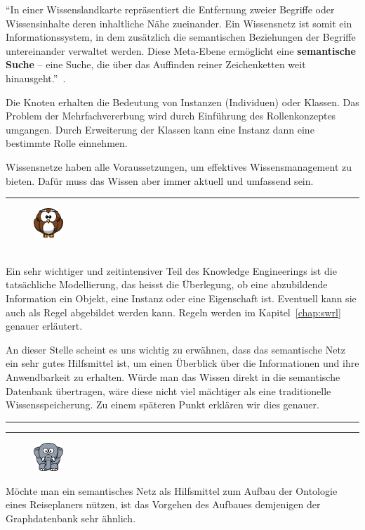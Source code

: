 ``In einer Wissenslandkarte repräsentiert die Entfernung zweier Begriffe oder Wissensinhalte deren inhaltliche Nähe zueinander. Ein Wissensnetz ist somit ein Informationssystem, in dem zusätzlich die semantischen Beziehungen der Begriffe untereinander verwaltet werden. Diese Meta-Ebene ermöglicht eine \textbf{semantische Suche} – eine Suche, die über das Auffinden reiner Zeichenketten weit hinausgeht.''~\cite[S. 89]{laemmel}.

Die Knoten erhalten die Bedeutung von Instanzen (Individuen) oder Klassen. Das Problem der Mehrfachvererbung wird durch Einführung des Rollenkonzeptes umgangen. Durch Erweiterung der Klassen kann eine Instanz dann eine bestimmte Rolle einnehmen.

Wissensnetze haben alle Voraussetzungen, um effektives Wissensmanagement zu bieten. Dafür muss das Wissen aber immer aktuell und umfassend sein.

\newpage

\noindent\rule[1ex]{\textwidth}{1pt}
\begin{figure}
    \vspace{-2pt}
    \includegraphics[width=0.1\textwidth]{bilder/owl.png}
\end{figure}\\
Ein sehr wichtiger und zeitintensiver Teil des Knowledge Engineerings ist die tatsächliche Modellierung, das heisst die Überlegung, ob eine abzubildende Information ein Objekt, eine Instanz oder eine Eigenschaft ist. Eventuell kann sie auch als Regel abgebildet werden kann. Regeln werden im Kapitel~\ref{chap:swrl}  genauer erläutert.

An dieser Stelle scheint es uns wichtig zu erwähnen, dass das semantische Netz ein sehr gutes Hilfsmittel ist, um einen Überblick über die Informationen und ihre Anwendbarkeit zu erhalten. Würde man das Wissen direkt in die semantische Datenbank übertragen, wäre diese nicht viel mächtiger als eine traditionelle Wissensspeicherung. Zu einem späteren Punkt erklären wir dies genauer.

\noindent\rule[1ex]{\textwidth}{1pt}


\noindent\rule[1ex]{\textwidth}{1pt}
\begin{figure}
    \vspace{-12pt}
    \includegraphics[width=0.1\textwidth]{bilder/elephant.png}
\end{figure}
Möchte man ein semantisches Netz als Hilfsmittel zum Aufbau der Ontologie eines Reiseplaners nützen, ist das Vorgehen des Aufbaues demjenigen der Graphdatenbank sehr ähnlich.

